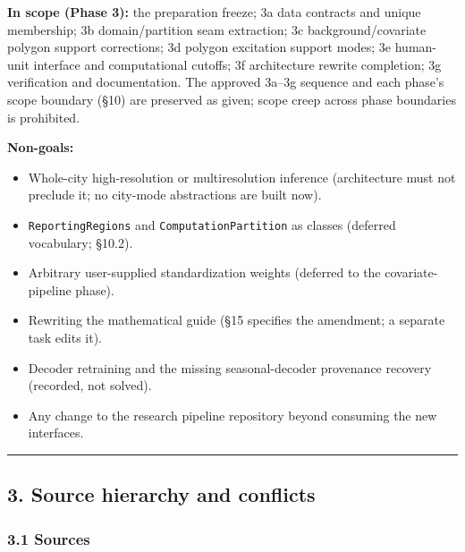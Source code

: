 \documentclass[
  10pt,
]{article}
\providecommand{\tightlist}{%
  \setlength{\itemsep}{0pt}\setlength{\parskip}{0pt}}
\begin{document}
\textbf{In scope (Phase 3):} the preparation freeze; 3a data contracts and unique membership; 3b domain/partition seam extraction; 3c background/covariate polygon support corrections; 3d polygon excitation support modes; 3e human-unit interface and computational cutoffs; 3f architecture rewrite completion; 3g verification and documentation. The approved 3a--3g sequence and each phase's scope boundary (§10) are preserved as given; scope creep across phase boundaries is prohibited.

\textbf{Non-goals:}

\begin{itemize}
\tightlist
\item
  Whole-city high-resolution or multiresolution inference (architecture must not preclude it; no city-mode abstractions are built now).
\item
  \texttt{ReportingRegions} and \texttt{ComputationPartition} as classes (deferred vocabulary; §10.2).
\item
  Arbitrary user-supplied standardization weights (deferred to the covariate-pipeline phase).
\item
  Rewriting the mathematical guide (§15 specifies the amendment; a separate task edits it).
\item
  Decoder retraining and the missing seasonal-decoder provenance recovery (recorded, not solved).
\item
  Any change to the research pipeline repository beyond consuming the new interfaces.
\end{itemize}

\begin{center}\rule{0.5\linewidth}{0.5pt}\end{center}

\hypertarget{source-hierarchy-and-conflicts}{%
\subsection{3. Source hierarchy and conflicts}\label{source-hierarchy-and-conflicts}}

\hypertarget{sources}{%
\subsubsection{3.1 Sources}\label{sources}}
\end{document}
